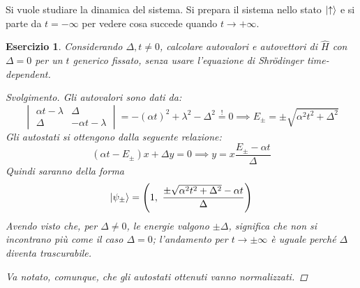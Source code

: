 \documentclass[11pt, a4paper]{scrartcl} %
\numberwithin{equation}{subsection}
\theoremstyle{style2}
\theoremstyle{style1}
\newtheorem{esercizio}{Esercizio}[section]
\renewcommand\qedsymbol{$\blacksquare$}
\newenvironment{svolgimento}{\renewcommand\qedsymbol{$\spadesuit$}\begin{proof}[Svolgimento]}{\end{proof}}
\begin{document}
Si vuole studiare la dinamica del sistema. 
Si prepara il sistema nello stato $\ket{\uparrow} $ e si parte da $t = -\infty$ per vedere cosa succede quando $t\to + \infty$.
\begin{esercizio}
	Considerando $\Delta , t \neq 0$, calcolare autovalori e autovettori di $\hat{H}$ con $\Delta = 0 $ per un $t$ generico fissato, senza usare l'equazione di Shr\"odinger time-dependent.
	\begin{svolgimento}
	Gli autovalori sono dati da:
	\[
		\begin{vmatrix} \alpha t -\lambda & \Delta \\ \Delta  & - \alpha t - \lambda   \end{vmatrix} = -(\alpha t)^2 + \lambda ^2 - \Delta ^2 \stackrel{!}{=}0\implies E_{\pm} = \pm\sqrt{\alpha ^2 t^2 + \Delta ^2} 
	\] 
	Gli autostati si ottengono dalla seguente relazione:
	\[
		(\alpha t - E_\pm)x  + \Delta y = 0 \implies y = x\frac{E_\pm -\alpha t}{\Delta }
	\] 
	Quindi saranno della forma
	\[
	\ket{\psi _\pm} = \left(1 ,\ \frac{\pm\sqrt{\alpha ^2 t^2 + \Delta ^2} - \alpha t}{\Delta }\right)  
	\] 
	Avendo visto che, per $\Delta \neq 0$, le energie valgono $\pm\Delta $, significa che non si incontrano pi\`u come il caso $\Delta =0$; l'andamento per $t\to \pm\infty$ \`e uguale perch\'e $\Delta $ diventa trascurabile.
	
	Va notato, comunque, che gli autostati ottenuti vanno normalizzati.
	\end{svolgimento}
\end{esercizio}
\end{document}
